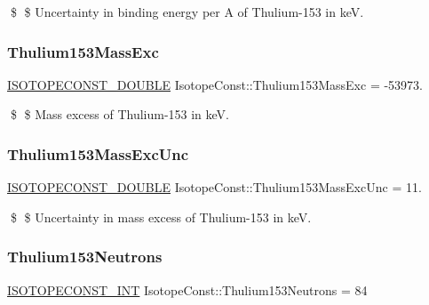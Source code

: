 \$ \$ Uncertainty in binding energy per A of Thulium-\/153 in keV. \mbox{\label{group___isotope_const-_thulium-_tm153_ga3af696aa6bd4df50c52b356a6aa7a26d}} 
\subsubsection{\texorpdfstring{Thulium153\+Mass\+Exc}{Thulium153MassExc}}
{\footnotesize\ttfamily \mbox{\hyperlink{group___isotope_const-_macros_ga8f45a7272ce02c0b4c65c44636ed719a}{I\+S\+O\+T\+O\+P\+E\+C\+O\+N\+S\+T\+\_\+\+D\+O\+U\+B\+LE}} Isotope\+Const\+::\+Thulium153\+Mass\+Exc = -\/53973.}

\$ \$ Mass excess of Thulium-\/153 in keV. \mbox{\label{group___isotope_const-_thulium-_tm153_ga3c5c28774aafd107099149c38f21e16a}} 
\subsubsection{\texorpdfstring{Thulium153\+Mass\+Exc\+Unc}{Thulium153MassExcUnc}}
{\footnotesize\ttfamily \mbox{\hyperlink{group___isotope_const-_macros_ga8f45a7272ce02c0b4c65c44636ed719a}{I\+S\+O\+T\+O\+P\+E\+C\+O\+N\+S\+T\+\_\+\+D\+O\+U\+B\+LE}} Isotope\+Const\+::\+Thulium153\+Mass\+Exc\+Unc = 11.}

\$ \$ Uncertainty in mass excess of Thulium-\/153 in keV. \mbox{\label{group___isotope_const-_thulium-_tm153_ga438ebc14e4f08b4c72df32f495edde6c}} 
\subsubsection{\texorpdfstring{Thulium153\+Neutrons}{Thulium153Neutrons}}
{\footnotesize\ttfamily \mbox{\hyperlink{group___isotope_const-_macros_ga5f18360b3e99483a35c32d789e62621c}{I\+S\+O\+T\+O\+P\+E\+C\+O\+N\+S\+T\+\_\+\+I\+NT}} Isotope\+Const\+::\+Thulium153\+Neutrons = 84}

